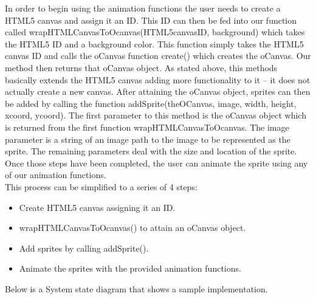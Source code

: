 \documentclass[12pt]{article}
\begin{document}
In order to begin using the animation functions the user needs to create a HTML5 canvas and assign it an ID. This ID can then be fed into our function called wrapHTMLCanvasToOcanvas(HTML5canvasID, background) which takes the HTML5 ID and a background color. This function simply takes the HTML5 canvas ID and calls the oCanvas function create() which creates the oCanvas. Our method then returns that oCanvas object. As stated above, this methods basically extends the HTML5 canvas adding more functionality to it -- it does not actually create a new canvas. After attaining the oCanvas object, sprites can then be added by calling the function addSprite(theOCanvas, image, width, height, xcoord, ycoord). The first parameter to this method is the oCanvas object which is returned from the first function wrapHTMLCanvasToOcanvas. The image parameter is a string of an image path to the image to be represented as the sprite. The remaining parameters deal with the size and location of the sprite. Once those steps have been completed, the user can animate the sprite using any of our animation functions. \\

This process can be simplified to a series of 4 steps:
\begin{itemize}
\item Create HTML5 canvas assigning it an ID.
\item wrapHTMLCanvasToOcanvas() to attain an oCanvas object.
\item Add sprites by calling addSprite().
\item Animate the sprites with the provided animation functions.\\
\end{itemize}

Below is a System state diagram that shows a sample implementation.
\end{document}
